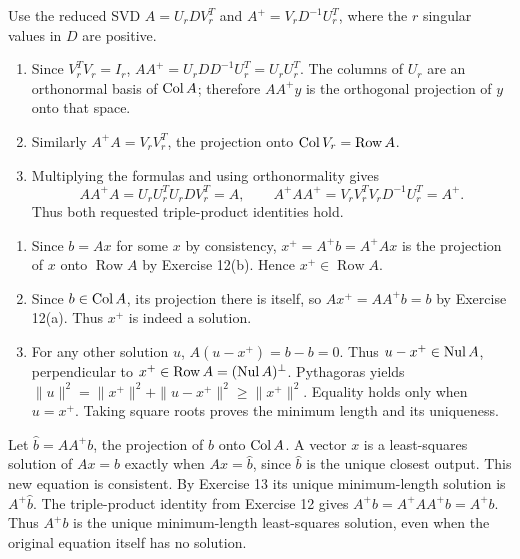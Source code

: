 Use the reduced SVD $A=U_rDV_r^T$ and
$A^+=V_rD^{-1}U_r^T$, where the $r$ singular values in $D$ are positive.
\begin{enumerate}[label=(\alph*)]
\item Since $V_r^TV_r=I_r$,
$AA^+=U_rDD^{-1}U_r^T=U_rU_r^T$.
The columns of $U_r$ are an orthonormal basis of $\operatorname{Col} A$;
therefore $AA^+y$ is the orthogonal projection of $y$ onto that space.
\item Similarly $A^+A=V_rV_r^T$, the projection onto
$\operatorname{Col} V_r=\operatorname{Row}A$.
\item Multiplying the formulas and using orthonormality gives
\[
 AA^+A=U_rU_r^TU_rDV_r^T=A,
 \qquad A^+AA^+=V_rV_r^TV_rD^{-1}U_r^T=A^+.
\]
Thus both requested triple-product identities hold.
\end{enumerate}

\begin{enumerate}[label=(\alph*)]
\item Since $b=Ax$ for some $x$ by consistency,
$x^+=A^+b=A^+Ax$ is the projection of $x$ onto $\operatorname{Row}A$
by Exercise 12(b). Hence $x^+\in\operatorname{Row}A$.
\item Since $b\in\operatorname{Col} A$, its projection there is itself, so
$Ax^+=AA^+b=b$ by Exercise 12(a). Thus $x^+$ is indeed a solution.
\item For any other solution $u$, $A(u-x^+)=b-b=0$.
Thus $u-x^+\in\operatorname{Nul} A$, perpendicular to
$x^+\in\operatorname{Row}A=(\operatorname{Nul} A)^\perp$.
Pythagoras yields
$\|u\|^2=\|x^+\|^2+\|u-x^+\|^2\ge\|x^+\|^2$.
Equality holds only when $u=x^+$. Taking square roots proves the minimum
length and its uniqueness.
\end{enumerate}

Let $\widehat b=AA^+b$, the projection of $b$ onto $\operatorname{Col} A$.
A vector $x$ is a least-squares solution of $Ax=b$ exactly when
$Ax=\widehat b$, since $\widehat b$ is the unique closest output.
This new equation is consistent.
By Exercise 13 its unique minimum-length solution is $A^+\widehat b$.
The triple-product identity from Exercise 12 gives
$A^+\widehat b=A^+AA^+b=A^+b$.
Thus $\boxed{A^+b}$ is the unique minimum-length least-squares solution,
even when the original equation itself has no solution.

